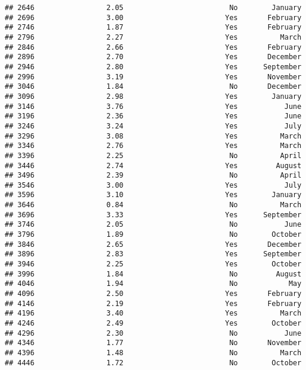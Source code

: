 \documentclass[
]{article}
\begin{document}
\begin{verbatim}
## 2646                 2.05                         No        January
## 2696                 3.00                        Yes       February
## 2746                 1.87                        Yes       February
## 2796                 2.27                        Yes          March
## 2846                 2.66                        Yes       February
## 2896                 2.70                        Yes       December
## 2946                 2.80                        Yes      September
## 2996                 3.19                        Yes       November
## 3046                 1.84                         No       December
## 3096                 2.98                        Yes        January
## 3146                 3.76                        Yes           June
## 3196                 2.36                        Yes           June
## 3246                 3.24                        Yes           July
## 3296                 3.08                        Yes          March
## 3346                 2.76                        Yes          March
## 3396                 2.25                         No          April
## 3446                 2.74                        Yes         August
## 3496                 2.39                         No          April
## 3546                 3.00                        Yes           July
## 3596                 3.10                        Yes        January
## 3646                 0.84                         No          March
## 3696                 3.33                        Yes      September
## 3746                 2.05                         No           June
## 3796                 1.89                         No        October
## 3846                 2.65                        Yes       December
## 3896                 2.83                        Yes      September
## 3946                 2.25                        Yes        October
## 3996                 1.84                         No         August
## 4046                 1.94                         No            May
## 4096                 2.50                        Yes       February
## 4146                 2.19                        Yes       February
## 4196                 3.40                        Yes          March
## 4246                 2.49                        Yes        October
## 4296                 2.30                         No           June
## 4346                 1.77                         No       November
## 4396                 1.48                         No          March
## 4446                 1.72                         No        October

\end{verbatim}
\end{document}
